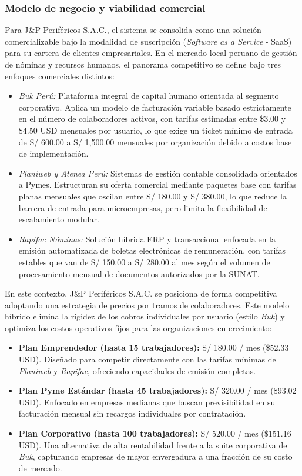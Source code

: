 \subsubsection{Modelo de negocio y viabilidad comercial}
Para J\&P Periféricos S.A.C., el sistema se consolida como una solución comercializable bajo la modalidad de suscripción (\textit{Software as a Service} - SaaS) para su cartera de clientes empresariales.
En el mercado local peruano de gestión de nóminas y recursos humanos, el panorama competitivo se define bajo tres enfoques comerciales distintos:

\begin{itemize}
    \item \textit{Buk Perú:} Plataforma integral de capital humano orientada al segmento corporativo. 
    Aplica un modelo de facturación variable basado estrictamente en el número de colaboradores activos, 
    con tarifas estimadas entre \$3.00 y \$4.50 USD mensuales por usuario, 
    lo que exige un ticket mínimo de entrada de S/ 600.00 a S/ 1,500.00 mensuales por organización debido a costos base de implementación.
    \item \textit{Planiweb y Atenea Perú:} Sistemas de gestión contable consolidada orientados a Pymes. 
    Estructuran su oferta comercial mediante paquetes base con tarifas planas mensuales que oscilan entre S/ 180.00 y S/ 380.00, 
    lo que reduce la barrera de entrada para microempresas, pero limita la flexibilidad de escalamiento modular.
    \item \textit{Rapifac Nóminas:} Solución híbrida ERP y transaccional enfocada en la emisión automatizada de boletas electrónicas de remuneración, 
    con tarifas estables que van de S/ 150.00 a S/ 280.00 al mes según el volumen de procesamiento mensual de documentos autorizados por la SUNAT.
\end{itemize}

En este contexto, J\&P Periféricos S.A.C. 
se posiciona de forma competitiva adoptando una estrategia de precios por tramos de colaboradores. 
Este modelo híbrido elimina la rigidez de los cobros individuales por usuario (estilo \textit{Buk}) y optimiza los costos operativos fijos para las organizaciones en crecimiento:

\begin{itemize}
    \item \textbf{Plan Emprendedor (hasta 15 trabajadores):} S/ 180.00 / mes (\$52.33 USD). Diseñado para competir directamente con las tarifas mínimas de \textit{Planiweb} y \textit{Rapifac}, 
    ofreciendo capacidades de emisión completas.
    \item \textbf{Plan Pyme Estándar (hasta 45 trabajadores):} S/ 320.00 / mes (\$93.02 USD). Enfocado en empresas medianas que buscan previsibilidad en su facturación mensual 
    sin recargos individuales por contratación.
    \item \textbf{Plan Corporativo (hasta 100 trabajadores):} S/ 520.00 / mes (\$151.16 USD). Una alternativa de alta rentabilidad frente a la suite corporativa de \textit{Buk}, 
    capturando empresas de mayor envergadura a una fracción de su costo de mercado.
\end{itemize}

